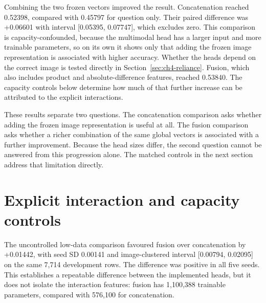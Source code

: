 Combining the two frozen vectors improved the result. Concatenation reached
0.52398, compared with 0.45797 for question only. Their paired difference was
+0.06601 with interval [0.05395, 0.07747], which excludes zero. This
comparison is capacity-confounded, because the multimodal head has a larger
input and more trainable parameters, so on its own it shows only that adding the
frozen image representation is associated with higher accuracy. Whether the
heads depend on the correct image is tested directly in
Section~\ref{sec:ch4-reliance}. Fusion, which also includes product and
absolute-difference features, reached 0.53840. The capacity controls below
determine how much of that further increase can be attributed to the explicit interactions.

These results separate two questions. The concatenation comparison asks
whether adding the frozen image representation is useful at all. The fusion
comparison asks whether a richer combination of the same global vectors is
associated with a further improvement. Because the head sizes differ, the
second question cannot be answered from this progression alone. The matched
controls in the next section address that limitation directly.

\begin{table}[p]
\centering
\caption[Controlled 40k development accuracies.]{Controlled top-100 development accuracies at \texttt{train\_40k}, using five seeds on 7,714 questions over 768 represented images. Seed SD and the image-clustered interval describe different sources of variation.}
\label{tab:ch4-progression}
\begingroup\scriptsize\setlength{\tabcolsep}{3pt}
\renewenvironment{longtable}[1]{\begin{tabular}{|p{0.28\textwidth}|p{0.16\textwidth}|p{0.14\textwidth}|p{0.25\textwidth}|}}{\end{tabular}}
\let\endhead\relax\renewcommand{\_}{\textunderscore\allowbreak}

\endgroup
\end{table}

\section{Explicit interaction and capacity controls}
\label{sec:ch4-interaction}
The uncontrolled low-data comparison favoured fusion over concatenation by
+0.01442, with seed SD 0.00141 and image-clustered interval [0.00794, 0.02095]
on the same 7,714 development rows. The difference was positive in all five
seeds. This establishes a repeatable difference between the implemented heads,
but it does not isolate the interaction features: fusion has 1,100,388
trainable parameters, compared with 576,100 for concatenation.

